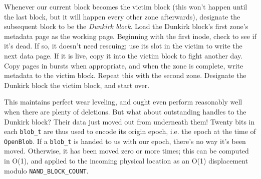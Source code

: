 \documentclass[letterpaper,10pt]{article}
\begin{document}
Whenever our current block becomes the victim block (this won't happen until the
last block, but it will happen every other zone afterwards), designate the subsequent
block to be the \textit{Dunkirk block}. Load the Dunkirk block's first zone's
metadata page as the working page. Beginning with the first inode, check to
see if it's dead. If so, it doesn't need rescuing; use its slot in the victim
to write the next data page. If it is live, copy it into the victim block to
fight another day. Copy pages in bursts when appropriate, and when the zone is
complete, write metadata to the victim block. Repeat this with the second zone.
Designate the Dunkirk block the victim block, and start over.

This maintains perfect wear leveling, and ought even perform reasonably well
when there are plenty of deletions. But what about outstanding handles to the
Dunkirk block? Their data just moved out from underneath them! Twenty bits in
each \texttt{blob\_t} are thus used to encode its origin epoch, i.e. the epoch
at the time of \texttt{OpenBlob}. If a \texttt{blob\_t} is handed to us with
our epoch, there's no way it's been moved. Otherwise, it has been moved zero or
more times; this can be computed in O(1), and applied to the incoming physical
location as an O(1) displacement modulo \texttt{NAND\_BLOCK\_COUNT}.
\end{document}
